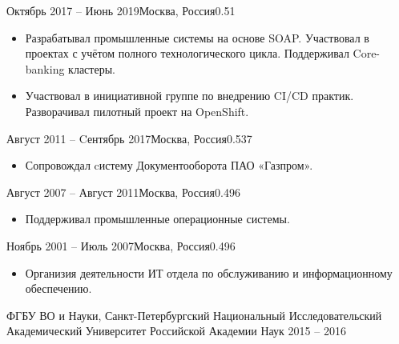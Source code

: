 \documentclass[10pt,a4paper,ragged2e]{maincv}
\begin{document}
\divider

{Октябрь 2017 -- Июнь 2019}{Москва, Россия}{0.51}
\begin{itemize}
\item {Разрабатывал промышленные системы на основе SOAP. Участвовал в проектах с учётом полного технологического цикла.
 Поддерживал Core-banking кластеры.}
\smallskip
\item {Участвовал в инициативной группе по внедрению CI/CD практик. Разворачивал пилотный проект на OpenShift.}
\end{itemize}

\divider

{Август 2011 -- Cентябрь 2017}{Москва, Россия}{0.537}
\begin{itemize}
\item Сопровождал cистему Документооборота ПАО «Газпром».
\end{itemize}

\divider

{Август 2007 -- Август 2011}{Москва, Россия}{0.496}
\begin{itemize}
\item Поддерживал промышленные операционные системы.
\end{itemize}

\divider

{Ноябрь 2001 -- Июль 2007}{Москва, Россия}{0.496}
\begin{itemize}
\item Организия деятельности ИТ отдела по обслуживанию и информационному обеспечению.
\end{itemize}

\clearpage


\begin{fullwidth}


{ФГБУ ВО и Науки, Санкт-Петербургский Национальный Исследовательский Академический \mbox{Университет} Российской Академии Наук}
{2015 -- 2016}{}

\end{fullwidth}
\end{document}
